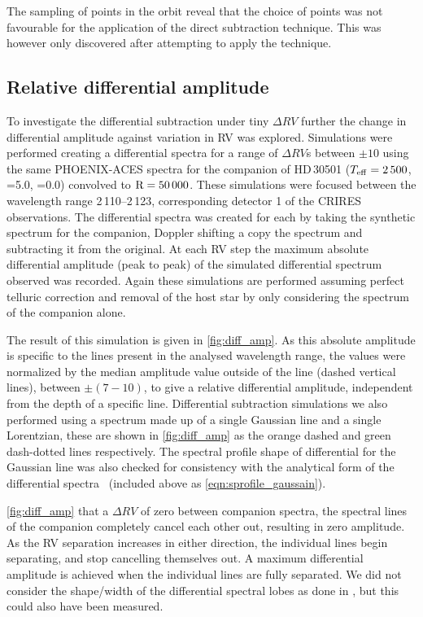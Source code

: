 The sampling of points in the orbit reveal that the choice of points was not favourable for the application of the direct subtraction technique.
This was however only discovered after attempting to apply the technique.




\subsection{Relative differential amplitude}
To investigate the differential subtraction under tiny \(\Delta RV\) further the change in differential amplitude against variation in {RV} was explored.
Simulations were performed creating a differential spectra for a range of \(\Delta {RV}\)s between \(\pm10\)\kmps{} using the same {PHOENIX-ACES} spectra for the companion of {HD\,30501} (\(T_{\mathrm{eff}}{}=2\,500\)\K{}, \logg{}=5.0, \feh{}=0.0) convolved to \(\textrm{R}=50\,000\).
These simulations were focused between the wavelength range 2\,110--2\,123\nm{}, corresponding detector 1 of the {CRIRES} observations.
The differential spectra was created for each by taking the synthetic spectrum for the companion, Doppler shifting a copy the spectrum and subtracting it from the original.
At each {RV} step the maximum absolute differential amplitude (peak to peak) of the simulated differential spectrum observed was recorded.
Again these simulations are performed assuming perfect telluric correction and removal of the host star by only considering the spectrum of the companion alone.

The result of this simulation is given in \cref{fig:diff_amp}.
As this absolute amplitude is specific to the lines present in the analysed wavelength range, the values were normalized by the median amplitude value outside of the line {\fwhm} (dashed vertical lines), between \(\pm(7-10)\)\kmps{}, to give a relative differential amplitude, independent from the depth of a specific line.
Differential subtraction simulations we also performed using a spectrum made up of a single Gaussian line and a single Lorentzian, these are shown in \cref{fig:diff_amp} as the orange dashed and green dash-dotted lines respectively.
The spectral profile shape of differential for the Gaussian line was also checked for consistency with the analytical form of the differential spectra~\citet[][Equation~A.1]{ferluga_separating_1997} (included above as \cref{eqn:sprofile_gaussain}).

\cref{fig:diff_amp} that a \(\Delta {RV}\) of zero between companion spectra, the spectral lines of the companion completely cancel each other out, resulting in zero amplitude.
As the {RV} separation increases in either direction, the individual lines begin separating, and stop cancelling themselves out.
A maximum differential amplitude is achieved when the individual lines are fully separated.
We did not consider the shape/width of the differential spectral lobes as done in \citet[][eqn.~A.1]{ferluga_separating_1997}, but this could also have been measured.

